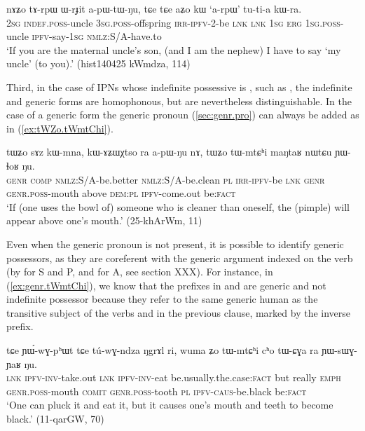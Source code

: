 \begin{exe}
\ex  \label{ex:tArpW}
\gll
nɤʑo 	tɤ-rpɯ 	ɯ-rɟit 	a-pɯ-tɯ-ŋu, 	tɕe 	tɕe 	aʑo 	kɯ 	`a-rpɯ' 	tu-ti-a 	kɯ-ra.  \\
\textsc{2sg} \textsc{indef.poss}-uncle \textsc{3sg.poss}-offspring \textsc{irr-ipfv}-2-be \textsc{lnk} \textsc{lnk} \textsc{1sg} \textsc{erg}  \textsc{1sg.poss}-uncle \textsc{ipfv}-say-\textsc{1sg} \textsc{nmlz:S/A}-have.to  \\
\glt `If you are the maternal uncle's son, (and I am the nephew) I have to say `my uncle' (to you).'  (hist140425 kWmdza, 114)
\end{exe}

Third, in the case of IPNs whose indefinite possessive is , such as , the indefinite and generic forms are homophonous, but are nevertheless distinguishable. In the case of a generic form the generic pronoun  (\ref{sec:genr.pro}) can always be added as in (\ref{ex:tWZo.tWmtChi}). 

\begin{exe}
\ex  \label{ex:tWZo.tWmtChi}
\gll tɯʑo sɤz kɯ-mna, kɯ-ɤʑɯχtso ra a-pɯ-ŋu nɤ,  tɯʑo tɯ-mtɕʰi maŋtaʁ nɯtɕu ɲɯ-ɬoʁ ŋu. \\
\textsc{genr} \textsc{comp} \textsc{nmlz}:S/A-be.better \textsc{nmlz}:S/A-be.clean \textsc{pl} \textsc{irr}-\textsc{ipfv}-be \textsc{lnk}  \textsc{genr} \textsc{genr.poss}-mouth above \textsc{dem:pl} \textsc{ipfv}-come.out be:\textsc{fact} \\
\glt `If (one uses the bowl of) someone who is cleaner than oneself, the (pimple) will appear above one's mouth.' (25-khArWm, 11)
\end{exe}

Even when the generic pronoun is not present, it is possible to identify generic possessors, as they are coreferent with the generic argument indexed on the verb (by  for S and P, and  for A, see section XXX). For instance, in (\ref{ex:genr.tWmtChi}), we know that  the  prefixes in  and   are generic and not indefinite possessor because they refer to the same generic human as the transitive subject of the verbs  and  in the previous clause, marked by the inverse prefix.

\begin{exe}
\ex  \label{ex:genr.tWmtChi}
\gll
tɕe ɲɯ́-wɣ-pʰɯt tɕe tú-wɣ-ndza ŋgrɤl ri, wuma ʑo tɯ-mtɕʰi cʰo tɯ-ɕɣa ra ɲɯ-sɯɣ-ɲaʁ ŋu. \\
\textsc{lnk} \textsc{ipfv}-\textsc{inv}-take.out \textsc{lnk} \textsc{ipfv}-\textsc{inv}-eat be.usually.the.case:\textsc{fact} but really \textsc{emph}  \textsc{genr.poss}-mouth \textsc{comit} \textsc{genr.poss}-tooth \textsc{pl}  \textsc{ipfv}-\textsc{caus}-be.black be:\textsc{fact} \\
\glt `One can pluck it and eat it, but it causes one's mouth and teeth to become black.' (11-qarGW, 70) 
\end{exe}

